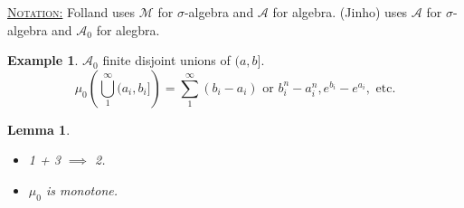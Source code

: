\documentclass{report}
\newcommand{\fancyem}[1]{\underline{\textsc{#1}}}
\newtheorem{lemma}[theorem]{Lemma}
\theoremstyle{definition}
\newtheorem{example}[theorem]{Example}
\theoremstyle{remark}
\begin{document}
\fancyem{Notation:} Folland uses $\mathcal{M}$ for $\sigma$-algebra and $\mathcal{A}$ for algebra. (Jinho) uses $\mathcal{A}$ for $\sigma$-algebra and $\mathcal{A}_0$ for alegbra.

\begin{example}
$\mathcal{A}_0$ finite disjoint unions of $(a, b].$
\[
\mu_0\left( \bigcup_1^\infty (a_i, b_i]\right) = \sum_1^\infty (b_i - a_i) \text{ or $b_i^n - a_i^n, e^{b_i} - e^{a_i},$ etc.}
\]
\end{example}

\begin{lemma}
\begin{itemize}
\item 1 + 3 $\implies$ 2.
\item $\mu_0$ is monotone.
\end{itemize}
\end{lemma}
\end{document}
